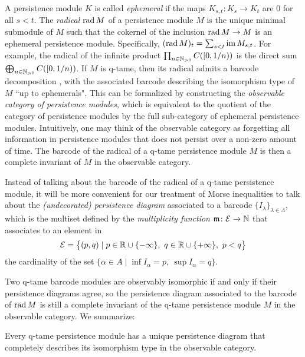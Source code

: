 A persistence module $K$ is called \emph{ephemeral} if the maps $K_{s,t} \colon K_s \to K_t$ are $0$ for all $s < t$.
The \emph{radical} $\operatorname{rad} M$ of a persistence module $M$ is the unique minimal submodule of $M$ such that the cokernel of the inclusion $\operatorname{rad} M \to M$ is an ephemeral persistence module.
Specifically, $(\operatorname{rad} M)_t = \sum_{s<t}\operatorname{im} M_{s,t}$.
For example, the radical of the infinite product $\prod_{n \in \mathbb{N}_{> 0}} C([0,1/n))$ is the direct sum $\bigoplus_{n \in \mathbb{N}_{> 0}} C([0,1/n))$.
If $M$ is q-tame, then its radical admits a barcode decomposition \cite[Corollary~3.6]{Chazal.2016b},
with the associated barcode describing the isomorphism type of~$M$ ``up to ephemerals".
This can be formalized by constructing the \emph{observable category of persistence modules}, which is equivalent to the quotient of the category of persistence modules by the full sub-category of ephemeral persistence modules.
Intuitively, one may think of the observable category as forgetting all information in persistence modules that does not persist over a non-zero amount of time.
The barcode of the radical of a q-tame persistence module $M$ is then a complete invariant of $M$ in the observable category.

Instead of talking about the barcode of the radical of a q-tame persistence module, it will be more convenient for our treatment of Morse inequalities to talk about the \emph{(undecorated) persistence diagram} associated to a barcode $\{I_{\lambda}\}_{\lambda \in \Lambda}$, which is the multiset defined by the \emph{multiplicity function} $\mathfrak{m} \colon \mathcal{E} \to \mathbb{N}$ that associates to an element in
\begin{equation*}
\mathcal{E} =
\big\{ (p,q) \mid p \in \mathbb{R} \cup \{-\infty\}, \ q \in \mathbb{R} \cup \{+\infty\}, \ p < q \big\}
\end{equation*}
the cardinality of the set $\{ \alpha \in A \mid \inf I_{\alpha} = p,\ \sup I_{\alpha} = q\}$.

Two q-tame barcode modules are observably isomorphic if and only if their persistence diagrams agree, so the persistence diagram associated to the barcode of $\operatorname{rad} M$ is still a complete invariant of the q-tame persistence module $M$ in the observable category.
We summarize:

\begin{thm} \label{thm:q-tame modules have barcodes}
    Every q-tame persistence module has a unique persistence diagram that completely describes its isomorphism type in the observable category.
\end{thm}

